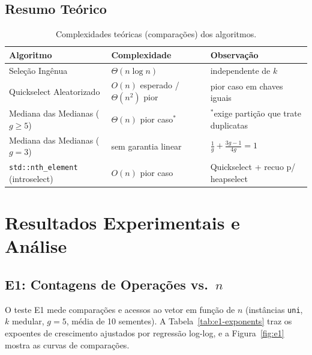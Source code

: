 \documentclass{infufrgs}
\begin{document}
\subsection{Resumo Teórico}

\begin{table}[H]
\centering
\caption{Complexidades teóricas (comparações) dos algoritmos.}
\label{tab:complexidades}
\begin{tabular}{lll}
\toprule
\textbf{Algoritmo} & \textbf{Complexidade} & \textbf{Observação} \\
\midrule
Seleção Ingênua          & $\Theta(n \log n)$                    & independente de $k$ \\
Quickselect Aleatorizado & $O(n)$ esperado / $\Theta(n^2)$ pior  & pior caso em chaves iguais \\
Mediana das Medianas ($g\ge 5$) & $\Theta(n)$ pior caso$^\ast$   & $^\ast$exige partição que trate duplicatas \\
Mediana das Medianas ($g = 3$)  & sem garantia linear           & $\tfrac1g + \tfrac{3g-1}{4g} = 1$ \\
\texttt{std::nth\_element} (introselect) & $O(n)$ pior caso     & Quickselect + recuo p/ heapselect \\
\bottomrule
\end{tabular}
\end{table}

\section{Resultados Experimentais e Análise}

\subsection{E1: Contagens de Operações vs.\ $n$}

O teste E1 mede comparações e acessos ao vetor em função de $n$ (instâncias \texttt{uni}, $k$ medular, $g = 5$, média de 10 sementes). A Tabela~\ref{tab:e1-exponents} traz os expoentes de crescimento ajustados por regressão log-log, e a Figura~\ref{fig:e1} mostra as curvas de comparações.
\end{document}
